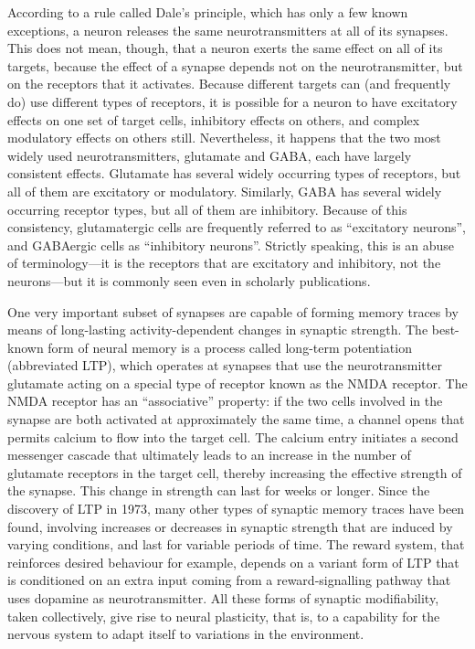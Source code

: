 \documentclass[]{book}
\begin{document}
According to a rule called Dale's principle, which has only a few known exceptions, a neuron releases the same neurotransmitters at all of its synapses. This does not mean, though, that a neuron exerts the same effect on all of its targets, because the effect of a synapse depends not on the neurotransmitter, but on the receptors that it activates. Because different targets can (and frequently do) use different types of receptors, it is possible for a neuron to have excitatory effects on one set of target cells, inhibitory effects on others, and complex modulatory effects on others still. Nevertheless, it happens that the two most widely used neurotransmitters, glutamate and GABA, each have largely consistent effects. Glutamate has several widely occurring types of receptors, but all of them are excitatory or modulatory. Similarly, GABA has several widely occurring receptor types, but all of them are inhibitory. Because of this consistency, glutamatergic cells are frequently referred to as ``excitatory neurons'', and GABAergic cells as ``inhibitory neurons''. Strictly speaking, this is an abuse of terminology---it is the receptors that are excitatory and inhibitory, not the neurons---but it is commonly seen even in scholarly publications.

One very important subset of synapses are capable of forming memory traces by means of long-lasting activity-dependent changes in synaptic strength. The best-known form of neural memory is a process called long-term potentiation (abbreviated LTP), which operates at synapses that use the neurotransmitter glutamate acting on a special type of receptor known as the NMDA receptor. The NMDA receptor has an ``associative'' property: if the two cells involved in the synapse are both activated at approximately the same time, a channel opens that permits calcium to flow into the target cell. The calcium entry initiates a second messenger cascade that ultimately leads to an increase in the number of glutamate receptors in the target cell, thereby increasing the effective strength of the synapse. This change in strength can last for weeks or longer. Since the discovery of LTP in 1973, many other types of synaptic memory traces have been found, involving increases or decreases in synaptic strength that are induced by varying conditions, and last for variable periods of time. The reward system, that reinforces desired behaviour for example, depends on a variant form of LTP that is conditioned on an extra input coming from a reward-signalling pathway that uses dopamine as neurotransmitter. All these forms of synaptic modifiability, taken collectively, give rise to neural plasticity, that is, to a capability for the nervous system to adapt itself to variations in the environment.
\end{document}
